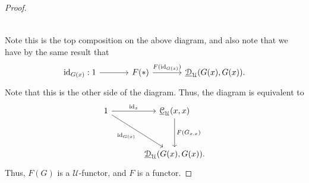 \begin{proof}
\[\begin{tikzcd}[row sep = 2.5em, column sep = 3.5em]
	\end{tikzcd}\]
	Note this is the top composition on the above diagram, and also note that we have by the same result that
	\[\begin{tikzcd}[row sep = 3.5em, column sep = 3.5em]
	\mathrm{id}_{G(x)} : 1 \ar[r]  & F(*)\ar[" F(\mathrm{id} _{G(x)} ) ", r]  & \underline{\mathcal{D} } _\mathcal{U} (G(x),G(x)).
	\end{tikzcd}\]
	Note that this is the other side of the diagram. Thus, the diagram is equivalent to
	\[\begin{tikzcd}[row sep = 3.5em, column sep = 3.5em]
	1\ar[" \mathrm{id}_x ", r] \ar[" \mathrm{id}_{G(x)}  "', dr]  & \underline{\mathcal{C} } _\mathcal{U} (x,x)\ar[" F(G_{x\text{,} x} ) ", d]  \\
	 & \underline{\mathcal{D} } _\mathcal{U} (G(x),G(x)).
	\end{tikzcd}\]
	Thus, $F(G)$ is a $\mathcal{U} $-functor, and $F$ is a functor.


\end{proof}
